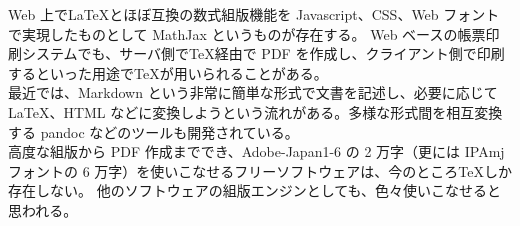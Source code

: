 Web 上で\LaTeX{}とほぼ互換の数式組版機能を Javascript、CSS、Web フォントで実現したものとして MathJax というものが存在する。
Web ベースの帳票印刷システムでも、サーバ側で\TeX{}経由で PDF を作成し、クライアント側で印刷するといった用途で\TeX{}が用いられることがある。\\

最近では、Markdown という非常に簡単な形式で文書を記述し、必要に応じて\LaTeX、HTML などに変換しようという流れがある。多様な形式間を相互変換する pandoc などのツールも開発されている。\\

高度な組版から PDF 作成まででき、Adobe-Japan1-{6} の 2 万字（更には IPAmj フォントの 6 万字）を使いこなせるフリーソフトウェアは、今のところ\TeX{}しか存在しない。\enlargethispage{+0.40zw}
他のソフトウェアの組版エンジンとしても、色々使いこなせると思われる。
